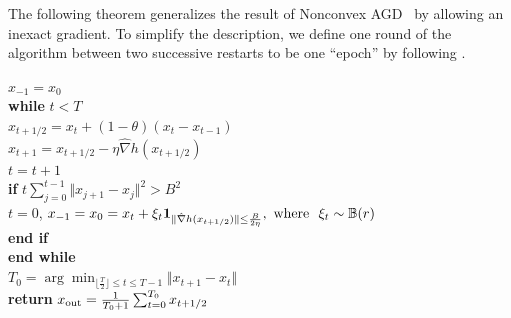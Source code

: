 The following theorem generalizes the result of Nonconvex AGD~\citep{li2023restarted} by allowing an inexact gradient. To simplify the description, we define one round of the algorithm between
two successive restarts to be one ``epoch'' by following \citet{li2023restarted}.

\begin{algorithm*}[htbp]  
\caption{Inexact Nonconvex Accelerated Gradient Descent} \label{alg:iAGD}
\begin{algorithmic}[1] 
\STATE $x_{-1} = x_0 $ \\
\STATE \textbf{while} $t <T$ \\
\STATE \quad $x_{t+1/2} = x_t + (1- \theta)(x_t - x_{t-1})$ \\
\STATE \quad $x_{t+1} = x_{t+1/2} - \eta \hat \nabla h(x_{t+1/2}) $ \\
\STATE \quad $t = t+1$ \\
\STATE \quad \textbf{if} $t \sum_{j=0}^{t-1} \Vert x_{j+1} - x_j \Vert^2 > B^2$ \\
\STATE \quad \quad $t=0$, $x_{-1} = x_0 = x_t + \xi_t {\bf{1}}_{ \Vert \hat \nabla h(x_{t+1/2}) \Vert \le \frac{B}{2 \eta} }, ~{\rm where} ~~\xi_t \sim {\mathbb{B}}(r)$ \\
\STATE \quad \textbf{end if} \\
\STATE \textbf{end while} \\
\STATE $T_0 = \arg \min_{ \lfloor \frac{T}{2} \rfloor \le t \le T-1} \Vert x_{t+1} - x_t \Vert$ \\
\STATE \textbf{return} $ x_{\rm out} = \frac{1}{T_0+ 1} \sum_{t=0}^{T_0} x_{t+1/2}$ \\
\end{algorithmic}
\end{algorithm*}



